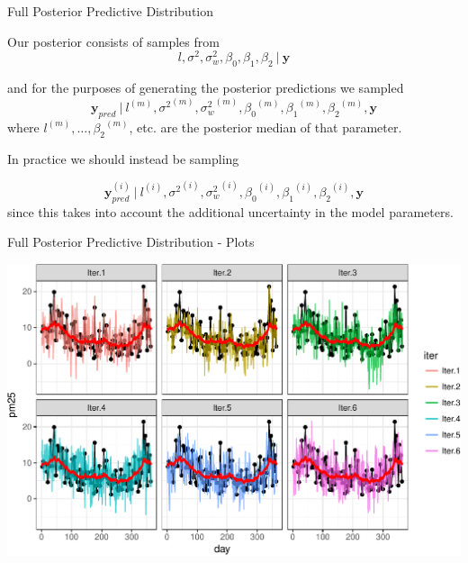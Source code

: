 \documentclass[11pt,ignorenonframetext,]{beamer}
\begin{document}
\begin{frame}[t]{%
\protect\hypertarget{full-posterior-predictive-distribution-1}{%
Full Posterior Predictive Distribution}}

Our posterior consists of samples from
\[ l, \sigma^2, \sigma^2_w, \beta_0, \beta_1, \beta_2 ~|~ \symbf{y} \]

and for the purposes of generating the posterior predictions we sampled
\[ \symbf{y}_{pred} ~|~ l^{(m)}, {\sigma^2}^{(m)}, {\sigma^2_w}^{(m)}, {\beta_0}^{(m)}, {\beta_1}^{(m)}, {\beta_2}^{(m)}, \symbf{y} \]
where \(l^{(m)}, \ldots, {\beta_2}^{(m)}\), etc. are the posterior
median of that parameter.

\pause

\vspace{5mm}

In practice we should instead be sampling

\[ \symbf{y}^{(i)}_{pred} ~|~ l^{(i)}, {\sigma^2}^{(i)}, {\sigma^2_w}^{(i)}, {\beta_0}^{(i)}, {\beta_1}^{(i)}, {\beta_2}^{(i)}, \symbf{y} \]
since this takes into account the additional uncertainty in the model
parameters.

\end{frame}

\begin{frame}{%
\protect\hypertarget{full-posterior-predictive-distribution---plots}{%
Full Posterior Predictive Distribution - Plots}}

\begin{center}\includegraphics[width=\textwidth]{Lec13_files/figure-beamer/unnamed-chunk-28-1} \end{center}

\end{frame}
\end{document}
